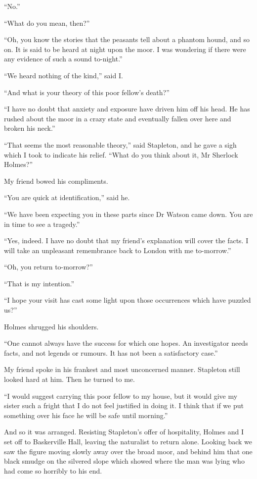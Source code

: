 \documentclass[paper=5.5in:8.5in,BCOR=7mm,twoside,DIV=calc,12pt,usegeometry,openany,chapterprefix,endperiod,headings=big]{scrbook} %
\begin{document}
\enquote{No.}

\enquote{What do you mean, then?}

\enquote{Oh, you know the stories that the peasants tell about a phantom hound, and so on. It is said to be heard at night upon the moor. I was wondering if there were any evidence of such a sound to-night.}

\enquote{We heard nothing of the kind,} said I.

\enquote{And what is your theory of this poor fellow's death?}

\enquote{I have no doubt that anxiety and exposure have driven him off his head. He has rushed about the moor in a crazy state and eventually fallen over here and broken his neck.}

\enquote{That seems the most reasonable theory,} said Stapleton, and he gave a sigh which I took to indicate his relief. \enquote{What do you think about it, Mr Sherlock Holmes?}

My friend bowed his compliments.

\enquote{You are quick at identification,} said he.

\enquote{We have been expecting you in these parts since Dr Watson came down. You are in time to see a tragedy.}

\enquote{Yes, indeed. I have no doubt that my friend's explanation will cover the facts. I will take an unpleasant remembrance back to London with me to-morrow.}

\enquote{Oh, you return to-morrow?}

\enquote{That is my intention.}

\enquote{I hope your visit has cast some light upon those occurrences which have puzzled us?}

Holmes shrugged his shoulders.

\enquote{One cannot always have the success for which one hopes. An investigator needs facts, and not legends or rumours. It has not been a satisfactory case.}

My friend spoke in his frankest and most unconcerned manner. Stapleton still looked hard at him. Then he turned to me.

\enquote{I would suggest carrying this poor fellow to my house, but it would give my sister such a fright that I do not feel justified in doing it. I think that if we put something over his face he will be safe until morning.}

And so it was arranged. Resisting Stapleton's offer of hospitality, Holmes and I set off to Baskerville Hall, leaving the naturalist to return alone. Looking back we saw the figure moving slowly away over the broad moor, and behind him that one black smudge on the silvered slope which showed where the man was lying who had come so horribly to his end.
\end{document}
